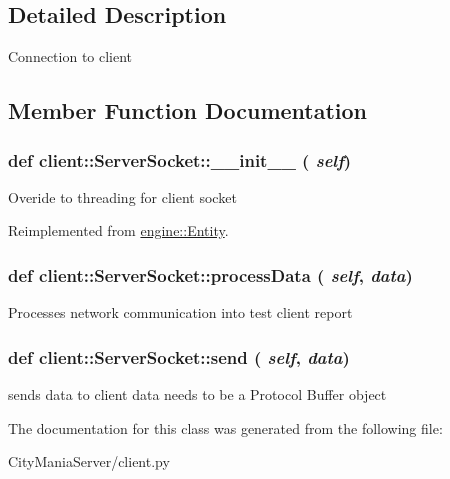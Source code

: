\subsection{Detailed Description}
\begin{DoxyVerb}
Connection to client
\end{DoxyVerb}
 

\subsection{Member Function Documentation}
\hypertarget{classclient_1_1ServerSocket_afd17124d2bc0b88553a4f64e17214d9f}{
\subsubsection[{\_\-\_\-init\_\-\_\-}]{\setlength{\rightskip}{0pt plus 5cm}def client::ServerSocket::\_\-\_\-init\_\-\_\- ( {\em self})}}
\label{classclient_1_1ServerSocket_afd17124d2bc0b88553a4f64e17214d9f}
\begin{DoxyVerb}
Overide to threading for client socket
\end{DoxyVerb}
 

Reimplemented from \hyperlink{classengine_1_1Entity}{engine::Entity}.\hypertarget{classclient_1_1ServerSocket_a1f01d7e9cdd9b697cb5e6baa95678493}{
\subsubsection[{processData}]{\setlength{\rightskip}{0pt plus 5cm}def client::ServerSocket::processData ( {\em self}, \/   {\em data})}}
\label{classclient_1_1ServerSocket_a1f01d7e9cdd9b697cb5e6baa95678493}
\begin{DoxyVerb}
Processes network communication into test client report
\end{DoxyVerb}
 \hypertarget{classclient_1_1ServerSocket_aca5718bbcca5e3ac2b1fd55e557ae594}{
\subsubsection[{send}]{\setlength{\rightskip}{0pt plus 5cm}def client::ServerSocket::send ( {\em self}, \/   {\em data})}}
\label{classclient_1_1ServerSocket_aca5718bbcca5e3ac2b1fd55e557ae594}
\begin{DoxyVerb}
sends data to client
data needs to be a Protocol Buffer object
\end{DoxyVerb}
 

The documentation for this class was generated from the following file:\begin{DoxyCompactItemize}
\item 
CityManiaServer/client.py\end{DoxyCompactItemize}
